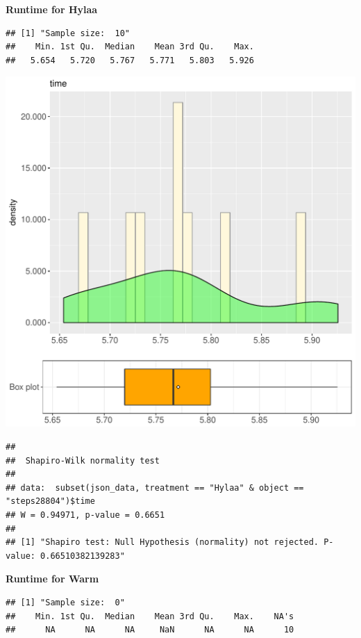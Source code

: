 \documentclass{article}\usepackage[]{graphicx}\usepackage[]{color}
\makeatletter
\def\maxwidth{ %
  \ifdim\Gin@nat@width>\linewidth
    \linewidth
  \else
    \Gin@nat@width
  \fi
}
\newenvironment{kframe}{%
 \def\at@end@of@kframe{}%
 \ifinner\ifhmode%
  \def\at@end@of@kframe{\end{minipage}}%
  \begin{minipage}{\columnwidth}%
 \fi\fi%
 \def\FrameCommand##1{\hskip\@totalleftmargin \hskip-\fboxsep
 \colorbox{shadecolor}{##1}\hskip-\fboxsep
     \hskip-\linewidth \hskip-\@totalleftmargin \hskip\columnwidth}%
 \MakeFramed {\advance\hsize-\width
   \@totalleftmargin\z@ \linewidth\hsize
   \@setminipage}}%
 {\par\unskip\endMakeFramed%
 \at@end@of@kframe}
\newenvironment{knitrout}{}{} %
\makeatother
\begin{document}
 \textbf{Runtime for Hylaa}
\begin{knitrout}
\color{fgcolor}\begin{kframe}
\begin{verbatim}
## [1] "Sample size:  10"
##    Min. 1st Qu.  Median    Mean 3rd Qu.    Max. 
##   5.654   5.720   5.767   5.771   5.803   5.926
\end{verbatim}
\end{kframe}
\includegraphics[width=\maxwidth]{figure/RH1_Hylaa_steps28804-1} 
\begin{kframe}\begin{verbatim}
## 
## 	Shapiro-Wilk normality test
## 
## data:  subset(json_data, treatment == "Hylaa" & object == "steps28804")$time
## W = 0.94971, p-value = 0.6651
## 
## [1] "Shapiro test: Null Hypothesis (normality) not rejected. P-value: 0.66510382139283"
\end{verbatim}
\end{kframe}
\end{knitrout}
 \textbf{Runtime for Warm}
\begin{knitrout}
\color{fgcolor}\begin{kframe}
\begin{verbatim}
## [1] "Sample size:  0"
##    Min. 1st Qu.  Median    Mean 3rd Qu.    Max.    NA's 
##      NA      NA      NA     NaN      NA      NA      10
\end{verbatim}
\end{kframe}
\end{knitrout}
  
\end{document}
